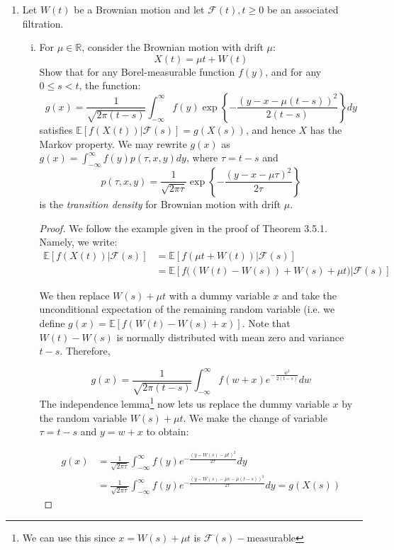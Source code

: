 \documentclass{article}
\makeatletter
\newcommand{\R}{\mathbb{R}}
\newcommand{\E}{\mathbb{E}}
\newcommand{\F}{\mathcal{F}}
\newcommand{\infint}{\int_{-\infty}^{\infty}}
\newcommand{\mylabel}[2]{#2\def\@currentlabel{#2}\label{#1}}
\newcommand{\pr}[1]{ \item[\mylabel{}{#1.}]}
\newcommand{\seq}[1]{\left\{ #1 \right\}}
\theoremstyle{definition}
\theoremstyle{definition}
\makeatother
\begin{document}
\begin{enumerate}
    \pr{3.6} Let $W(t)$ be a Brownian motion and let $\F(t), t \geq 0$ be an associated filtration.
    \begin{enumerate}[(i)]
        \item For $\mu \in \R$, consider the Brownian motion with drift $\mu$:
        $$ X(t) = \mu t + W(t)$$
        Show that for any Borel-measurable function $f(y)$, and for any $0 \le s <t$, the function:
        $$ g(x) = \frac{1}{\sqrt{2\pi(t-s)}} \infint f(y) \exp \seq{-\frac{(y-x-\mu(t-s))^2}{2(t-s)}}dy$$
        satisfies $\E[f(X(t))|\F(s)]=g(X(s))$, and hence $X$ has the Markov property. We may rewrite $g(x)$ as $g(x)=\infint f(y) p(\tau,x,y)dy$, where $\tau=t-s$ and
        $$ p(\tau,x,y) = \frac{1}{\sqrt{2\pi \tau}}\exp \seq{-\frac{(y-x-\mu\tau)^2}{2\tau}}$$ 
        is the \textit{transition density} for Brownian motion with drift $\mu$.
        
        \begin{proof} We follow the example given in the proof of Theorem 3.5.1. Namely, we write:
        \begin{align*} \E[f(X(t))|\F(s)] &= \E[f(\mu t + W(t))|\F(s)] \\
        &= \E[f\big((W(t)-W(s))+W(s)+\mu t \big)|\F(s)]
        \end{align*}
        
        
        We then replace $W(s)+\mu t$ with a dummy variable $x$ and take the unconditional expectation of the remaining random variable (i.e. we define $g(x) = \E[f(W(t)-W(s)+x)] $. Note that $W(t)-W(s)$ is normally distributed with mean zero and variance $t-s$. Therefore,
        
        $$ g(x) = \frac{1}{\sqrt{2\pi(t-s)}} \infint f(w+x)e^{-\frac{w^2}{2(t-s)}}dw $$
        The independence lemma\footnote{We can use this since $x=W(s)+\mu t$ is $\F(s)-$measurable} now lets us replace the dummy variable $x$ by the random variable $W(s)+\mu t$. We make the change of variable $\tau = t-s$ and $y=w+x$ to obtain:
        
        \begin{align*} g(x) &= \frac{1}{\sqrt{2\pi\tau}} \infint f(y) e^{-\frac{(y-W(s)-\mu t)^2}{2\tau}}dy \\
                        &= \frac{1}{\sqrt{2\pi\tau}} \infint f(y) e^{-\frac{(y-W(s)-\mu s - \mu(t-s) )^2}{2\tau}}dy  = g(X(s))
    \end{align*}        

        
        \end{proof}
        

\end{enumerate}
\end{enumerate}
\end{document}
